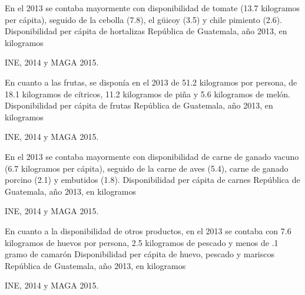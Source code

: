 
%
{%
En el 2013 se contaba mayormente con disponibilidad de tomate (13.7 kilogramos per cápita), seguido de la cebolla (7.8), el güicoy (3.5) y chile pimiento (2.6).}%
{%
	Disponibilidad per cápita de hortalizas } %
{%
	República de Guatemala, año 2013, en kilogramos } %
{%
	\begin{tikzpicture}[x=1pt,y=1pt]    \end{tikzpicture}}%
{%
	INE, 2014 y MAGA 2015.} %


%
{%
En cuanto a las frutas, se disponía en el 2013 de 51.2 kilogramos por persona, de 18.1 kilogramos de cítricos, 11.2 kilogramos de piña y 5.6 kilogramos de melón.}%
{%
	Disponibilidad per cápita de frutas } %
{%
	República de Guatemala, año 2013, en kilogramos } %
{%
	\begin{tikzpicture}[x=1pt,y=1pt]    \end{tikzpicture}}%
{%
	INE, 2014 y MAGA 2015.} %


%
{%
En el 2013 se contaba mayormente con disponibilidad de carne de ganado vacuno (6.7 kilogramos per cápita), seguido de la carne de aves (5.4), carne de ganado porcino (2.1) y embutidos (1.8).}%
{%
	Disponibilidad per cápita de carnes } %
{%
	República de Guatemala, año 2013, en kilogramos } %
{%
	\begin{tikzpicture}[x=1pt,y=1pt]    \end{tikzpicture}}%
{%
	INE, 2014 y MAGA 2015.} %


%
{%
En cuanto a la disponibilidad de otros productos, en el 2013 se contaba con 7.6 kilogramos de huevos por persona, 2.5 kilogramos de pescado y menos de .1 gramo de camarón
}%
{%
	Disponibilidad per cápita de huevo, pescado y mariscos } %
{%
	República de Guatemala, año 2013, en kilogramos } %
{%
	\begin{tikzpicture}[x=1pt,y=1pt]    \end{tikzpicture}}%
{%
	INE, 2014 y MAGA 2015.} %

